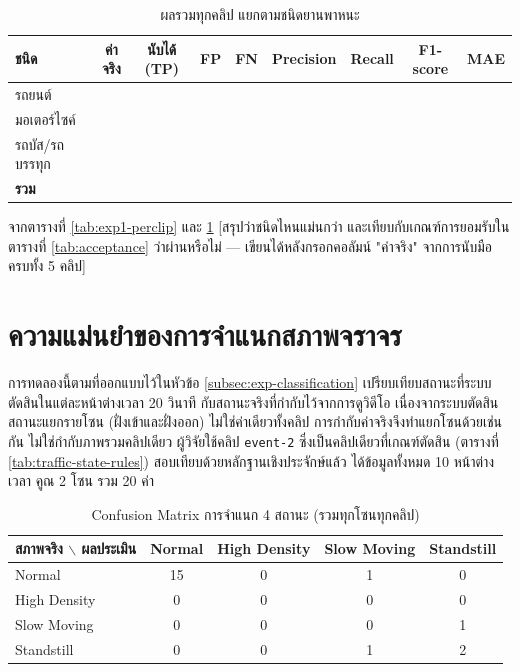 \begin{table}[ht]
\centering
\caption{ผลรวมทุกคลิป แยกตามชนิดยานพาหนะ}
\label{tab:exp1-pooled}
\begin{tabular}{|l|c|c|c|c|c|c|c|c|}
\hline
ชนิด & ค่าจริง & นับได้ (TP) & FP & FN & Precision & Recall & F1-score & MAE \\
\hline
รถยนต์ & & & & & & & & \\
\hline
มอเตอร์ไซค์ & & & & & & & & \\
\hline
รถบัส/รถบรรทุก & & & & & & & & \\
\hline
\textbf{รวม} & & & & & & & & \\
\hline
\end{tabular}
\end{table}

จากตารางที่ \ref{tab:exp1-perclip} และ \ref{tab:exp1-pooled} [สรุปว่าชนิดไหนแม่นกว่า และเทียบกับเกณฑ์การยอมรับในตารางที่ \ref{tab:acceptance} ว่าผ่านหรือไม่ — เขียนได้หลังกรอกคอลัมน์ "ค่าจริง" จากการนับมือครบทั้ง 5 คลิป]

\section{ความแม่นยำของการจำแนกสภาพจราจร}
\label{sec:res-classification}

การทดลองนี้ตามที่ออกแบบไว้ในหัวข้อ \ref{subsec:exp-classification} เปรียบเทียบสถานะที่ระบบตัดสินในแต่ละหน้าต่างเวลา 20 วินาที กับสถานะจริงที่กำกับไว้จากการดูวิดีโอ เนื่องจากระบบตัดสินสถานะแยกรายโซน (ฝั่งเข้าและฝั่งออก) ไม่ใช่ค่าเดียวทั้งคลิป การกำกับค่าจริงจึงทำแยกโซนด้วยเช่นกัน ไม่ใช่กำกับภาพรวมคลิปเดียว ผู้วิจัยใช้คลิป \texttt{event-2} ซึ่งเป็นคลิปเดียวที่เกณฑ์ตัดสิน (ตารางที่ \ref{tab:traffic-state-rules}) สอบเทียบด้วยหลักฐานเชิงประจักษ์แล้ว ได้ข้อมูลทั้งหมด 10 หน้าต่างเวลา คูณ 2 โซน รวม 20 ค่า

\begin{table}[ht]
\centering
\caption{Confusion Matrix การจำแนก 4 สถานะ (รวมทุกโซนทุกคลิป)}
\label{tab:confusion}
\begin{tabular}{|l|c|c|c|c|}
\hline
สภาพจริง $\backslash$ ผลประเมิน & Normal & High Density & Slow Moving & Standstill \\
\hline
Normal & 15 & 0 & 1 & 0 \\
\hline
High Density & 0 & 0 & 0 & 0 \\
\hline
Slow Moving & 0 & 0 & 0 & 1 \\
\hline
Standstill & 0 & 0 & 1 & 2 \\
\hline
\end{tabular}
\end{table}

